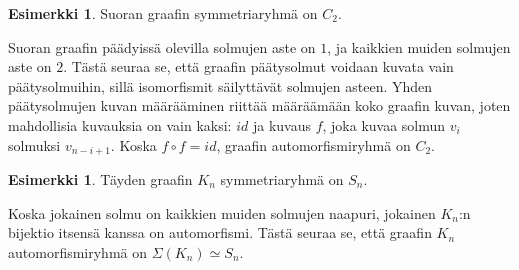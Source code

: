 \documentclass[a4paper, 12pt]{article}
\theoremstyle{definition}
\newtheorem{example}[mydef]{Esimerkki}
\theoremstyle{plain}
\begin{document}
\begin{example}
Suoran graafin symmetriaryhmä on $C_2$.

\begin{center}
\end{center}

Suoran graafin päädyissä olevilla solmujen aste on $1$, ja kaikkien muiden solmujen aste on $2$. Tästä seuraa se, että graafin päätysolmut voidaan kuvata vain päätysolmuihin, sillä isomorfismit säilyttävät solmujen asteen. Yhden päätysolmujen kuvan määrääminen riittää määräämään koko graafin kuvan, joten mahdollisia kuvauksia on vain kaksi: $id$ ja kuvaus $f$, joka kuvaa solmun $v_i$ solmuksi $v_{n - i + 1}$. Koska $f \circ f = id$, graafin automorfismiryhmä on $C_2$.
\end{example}

\begin{example}
Täyden graafin $K_n$ symmetriaryhmä on $S_n$.

\begin{center}
\end{center}

Koska jokainen solmu on kaikkien muiden solmujen naapuri, jokainen $K_n$:n bijektio itsensä kanssa on automorfismi. Tästä seuraa se, että graafin $K_n$ automorfismiryhmä on $\Sigma(K_n) \simeq S_n$.
\end{example}
\end{document}
